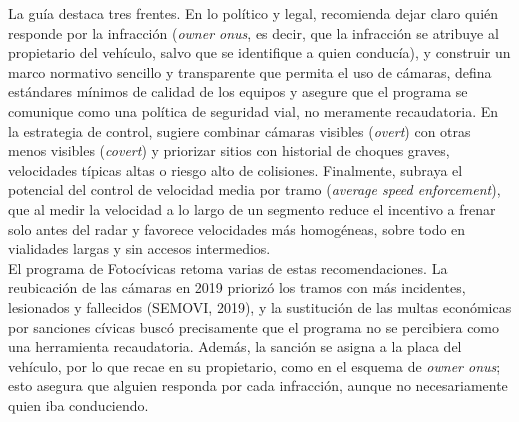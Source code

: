 La guía destaca tres frentes. En lo político y legal, recomienda dejar claro quién responde por la infracción (\emph{owner onus}, es decir, que la infracción se atribuye al propietario del vehículo, salvo que se identifique a quien conducía), y construir un marco normativo sencillo y transparente que permita el uso de cámaras, defina estándares mínimos de calidad de los equipos y asegure que el programa se comunique como una política de seguridad vial, no meramente recaudatoria. En la estrategia de control, sugiere combinar cámaras visibles (\emph{overt}) con otras menos visibles (\emph{covert}) y priorizar sitios con historial de choques graves, velocidades típicas altas o riesgo alto de colisiones. Finalmente, subraya el potencial del control de velocidad media por tramo (\emph{average speed enforcement}), que al medir la velocidad a lo largo de un segmento reduce el incentivo a frenar solo antes del radar y favorece velocidades más homogéneas, sobre todo en vialidades largas y sin accesos intermedios.\\

El programa de Fotocívicas retoma varias de estas recomendaciones. La reubicación de las cámaras en 2019 priorizó los tramos con más incidentes, lesionados y fallecidos (SEMOVI, 2019), y la sustitución de las multas económicas por sanciones cívicas buscó precisamente que el programa no se percibiera como una herramienta recaudatoria. Además, la sanción se asigna a la placa del vehículo, por lo que recae en su propietario, como en el esquema de \emph{owner onus}; esto asegura que alguien responda por cada infracción, aunque no necesariamente quien iba conduciendo.
